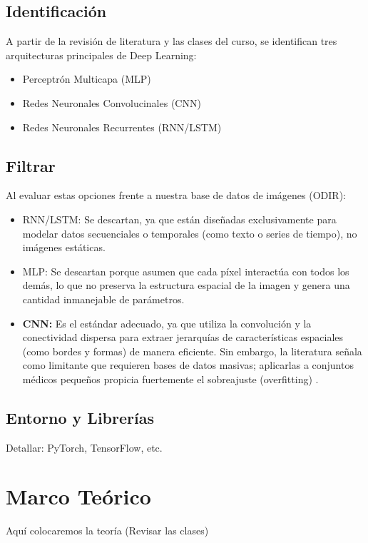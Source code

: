 \documentclass[12pt, a4paper]{article}
\begin{document}
\subsection{Identificación}

A partir de la revisión de literatura y las clases del curso, se identifican tres arquitecturas principales de Deep Learning: 
\begin{itemize}
    \item Perceptrón Multicapa (MLP)
    \item Redes Neuronales Convolucinales (CNN)
    \item Redes Neuronales Recurrentes (RNN/LSTM)
\end{itemize}

\subsection{Filtrar}

Al evaluar estas opciones frente a nuestra base de datos de imágenes (ODIR):

\begin{itemize}
    \item RNN/LSTM: Se descartan, ya que están diseñadas exclusivamente para modelar datos secuenciales o temporales (como texto o series de tiempo), no imágenes estáticas.
    
    \item MLP: Se descartan porque asumen que cada píxel interactúa con todos los demás, lo que no preserva la estructura espacial de la imagen y genera una cantidad inmanejable de parámetros.
    
    \item \textbf{CNN:} Es el estándar adecuado, ya que utiliza la convolución y la conectividad dispersa para extraer jerarquías de características espaciales (como bordes y formas) de manera eficiente. Sin embargo, la literatura señala como limitante que requieren bases de datos masivas; aplicarlas a conjuntos médicos pequeños propicia fuertemente el sobreajuste (overfitting)
.
\end{itemize}





\subsection{Entorno y Librerías}
Detallar: PyTorch, TensorFlow, etc.

\section{Marco Teórico}
Aquí colocaremos la teoría (Revisar las clases)
\end{document}
